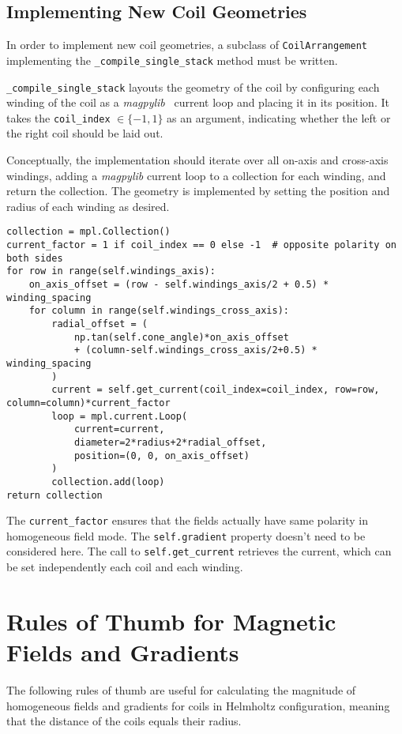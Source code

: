 \section*{Implementing New Coil Geometries}
In order to implement new coil geometries, a subclass of \texttt{CoilArrangement} implementing the \texttt{\_compile\_single\_stack} method must be written.

\texttt{\_compile\_single\_stack} layouts the geometry of the coil by configuring each winding of the coil as a \textit{magpylib}~\cite{noauthor_magpylibmagpylib_nodate} current loop and placing it in its position. It takes the \texttt{coil\_index} $\in \{-1, 1\}$ as an argument, indicating whether the left or the right coil should be laid out.

Conceptually, the implementation should iterate over all on-axis and cross-axis windings, adding a \textit{magpylib} current loop to a collection for each winding, and return the collection. The geometry is implemented by setting the position and radius of each winding as desired.
\begin{lstlisting}
collection = mpl.Collection()
current_factor = 1 if coil_index == 0 else -1  # opposite polarity on both sides
for row in range(self.windings_axis):
    on_axis_offset = (row - self.windings_axis/2 + 0.5) * winding_spacing
    for column in range(self.windings_cross_axis):
        radial_offset = (
            np.tan(self.cone_angle)*on_axis_offset
            + (column-self.windings_cross_axis/2+0.5) * winding_spacing
        )
        current = self.get_current(coil_index=coil_index, row=row, column=column)*current_factor
        loop = mpl.current.Loop(
            current=current,
            diameter=2*radius+2*radial_offset,
            position=(0, 0, on_axis_offset)
        )
        collection.add(loop)
return collection
\end{lstlisting}
The \texttt{current\_factor} ensures that the fields actually have same polarity in homogeneous field mode. The \texttt{self.gradient} property doesn't need to be considered here. The call to \texttt{self.get\_current} retrieves the current, which can be set independently each coil and each winding.



\chapter{Rules of Thumb for Magnetic Fields and Gradients}
The following rules of thumb are useful for calculating the magnitude of homogeneous fields and gradients for coils in Helmholtz configuration, meaning that the distance of the coils equals their radius.


